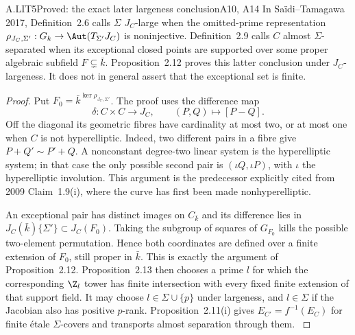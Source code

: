 \begin{claim}{A.LIT5}{Proved: the exact later largeness conclusion}{A10, A14}
In Sa\"idi--Tamagawa 2017, Definition~2.6 calls $\Sigma$ $J_C$-large
when the omitted-prime representation
$\rho_{J_C,\Sigma'}:G_k\to\Aut(T_{\Sigma'}J_C)$ is noninjective.
Definition~2.9 calls $C$ almost $\Sigma$-separated when its exceptional
closed points are supported over some proper algebraic subfield
$F\subsetneq\bar k$. Proposition~2.12 proves this latter conclusion
under $J_C$-largeness. It does not in general assert that the
exceptional set is finite.
\end{claim}
\begin{proof}
Put $F_0=\bar k^{\ker\rho_{J_C,\Sigma'}}$. The proof uses the difference
map
\[
 \delta:C\times C\longrightarrow J_C,\qquad (P,Q)\longmapsto[P-Q].
\]
Off the diagonal its geometric fibres have cardinality at most two,
or at most one when $C$ is not hyperelliptic. Indeed, two different
pairs in a fibre give $P+Q'\sim P'+Q$. A nonconstant degree-two linear
system is the hyperelliptic system; in that case the only possible
second pair is $(\iota Q,\iota P)$, with $\iota$ the hyperelliptic
involution. This argument is the predecessor explicitly cited from
2009 Claim~1.9(i), where the curve has first been made
nonhyperelliptic.

An exceptional pair has distinct images on $C_{\bar k}$ and its
difference lies in $J_C(\bar k)\{\Sigma'\}\subset J_C(F_0)$.
Taking the subgroup of squares of $G_{F_0}$ kills the possible
two-element permutation. Hence both coordinates are defined over a
finite extension of $F_0$, still proper in $\bar k$. This is exactly
the argument of Proposition~2.12. Proposition~2.13 then chooses a prime
$l$ for which the corresponding $\Z_l$ tower has finite intersection
with every fixed finite extension of that support field. It may choose
$l\in\Sigma\cup\{p\}$ under largeness, and $l\in\Sigma$ if the
Jacobian also has positive $p$-rank. Proposition~2.11(i) gives
$E_{C'}=f^{-1}(E_C)$ for finite \'etale $\Sigma$-covers and transports
almost separation through them.
\citep[Definitions~2.6,2.9 and Propositions~2.11--2.13]{LA_ST2017}
\end{proof}

